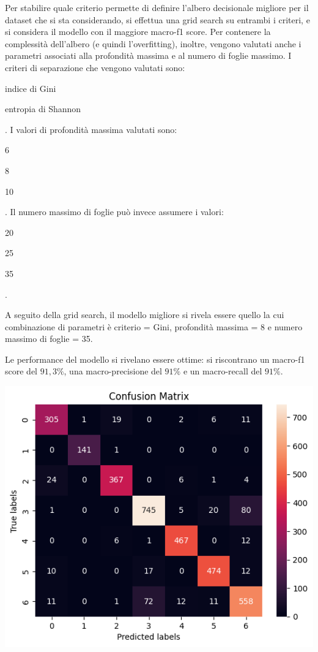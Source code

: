 Per stabilire quale criterio permette di definire l'albero decisionale
migliore per il dataset che si sta considerando, si effettua una grid search
su entrambi i criteri, e si considera il modello con il maggiore macro-f1 score.
Per contenere la complessità dell'albero (e quindi l'overfitting), inoltre,
vengono valutati anche i parametri associati alla profondità massima
e al numero di foglie massimo.
I criteri di separazione che vengono valutati sono: \begin{itemize*}
    \item indice di Gini
    \item entropia di Shannon
\end{itemize*}.
I valori di profondità massima valutati sono: \begin{itemize*}
    \item 6
    \item 8
    \item 10
\end{itemize*}.
Il numero massimo di foglie può invece assumere i valori: \begin{itemize*}
    \item 20
    \item 25
    \item 35
\end{itemize*}.

A seguito della grid search, il modello migliore si rivela essere quello la cui
combinazione di parametri è criterio = Gini, profondità massima = 8 e numero massimo
di foglie = 35.

Le performance del modello si rivelano essere ottime: si riscontrano 
un macro-f1 score del $91,3\%$, una macro-precisione del $91\%$ e 
un macro-recall del $91\%$.

\begin{Figure}
    \centering
    \includegraphics[width=\linewidth]{img/tree_confusion_matrix.png}
\end{Figure}

